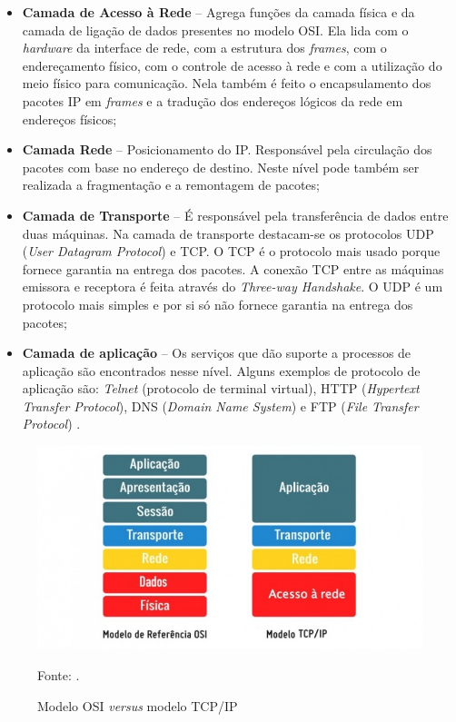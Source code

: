 \documentclass[
12pt,
openany, %
oneside, %
a4paper,			
english,			
brazil			        %
]{abntbibufjf}
\begin{document}
	\begin{itemize}
	    \item \textbf{Camada de Acesso à Rede} – Agrega funções da camada física e da camada de ligação de dados presentes no modelo OSI. Ela lida com o \textit{hardware} da interface de rede, com a estrutura dos \textit{frames}, com o endereçamento físico, com o controle de acesso à rede e com a utilização do meio físico para comunicação. Nela também é feito o encapsulamento dos pacotes IP em \textit{frames} e a tradução dos endereços lógicos da rede em endereços físicos;
	    \item \textbf{Camada Rede} – Posicionamento do IP. Responsável pela circulação dos pacotes com base no endereço de destino. Neste nível pode também ser realizada a fragmentação e a remontagem de pacotes;
	    \item \textbf{Camada de Transporte} – É responsável pela transferência de dados entre duas máquinas. Na camada de transporte destacam-se os protocolos UDP (\textit{User Datagram Protocol}) e TCP. O TCP é o protocolo mais usado porque fornece garantia na entrega dos pacotes. A conexão TCP entre as máquinas emissora e receptora é feita através do \textit{Three-way Handshake}. O UDP é um protocolo mais simples e por si só não fornece garantia na entrega dos pacotes;
	    \item \textbf{Camada de aplicação} – Os serviços que dão suporte a processos de aplicação são encontrados nesse nível. Alguns exemplos de protocolo de aplicação são: \textit{Telnet} (protocolo de terminal virtual), HTTP (\textit{Hypertext Transfer Protocol}), DNS (\textit{Domain Name System}) e FTP (\textit{File Transfer Protocol}) \cite{FEUP}.
	\end{itemize}

	\begin{figure}[!htb]
		\centering
		\includegraphics[scale=0.5]{Figuras/TCP-720x381.jpg}
		\caption{Modelo OSI \textit{versus} modelo TCP/IP}
		\label{modeloTCP}
		\par Fonte: \cite{PPLWARE}.
	\end{figure}
\end{document}

